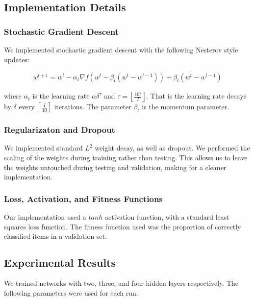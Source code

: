 \documentclass{article}
\DeclareMathOperator{\1}{\mathbbm{1}}
\begin{document}
\subsection{Implementation Details}

\subsubsection{Stochastic Gradient Descent}
We implemented stochastic gradient descent with the following Nesterov style updates:

\begin{align*}
w^{t+1} = w^t - \alpha_t \nabla f(w^t - \beta_t(w^t -w^{t-1})) +  \beta_t(w^t -w^{t-1})
\end{align*}

where $\alpha_t$ is the learning rate $\alpha  \delta^{\tau}$ and $\tau = \left \lfloor{ \frac {10t} I}\right \rfloor$. 
That is the learning rate decays by $\delta$ every $\left \lceil{ \frac I {10}}\right \rceil$ iterations. The parameter
$\beta_t$ is the momentum parameter. 

\subsubsection{Regularizaton and Dropout}
We implemented standard $L^2$ weight decay, as well as dropout. We performed the scaling of the weights during training
rather than testing. This allows us to leave the weights untouched during testing and validation, making for a cleaner implementation.

\subsubsection{Loss, Activation, and Fitness Functions}
Our implementation used a $tanh$ activation function, with a standard least squares loss function. The fitness function
used was the proportion of correctly classified items in a validation set.

\subsection{Experimental Results}
We trained networks with two, three, and four hidden layers respectively. The following parameters were used for each run:
\end{document}
